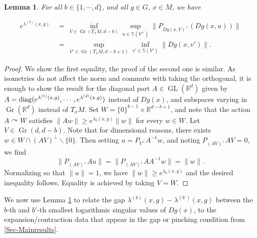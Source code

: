 \documentclass[11pt, leqno, fleqn]{amsart}
\newcommand{\margem}[1]{\marginpar{{\scriptsize {#1}}}}
\def\clo{   \color{orange}}
\def\clb{   \color{black}}
\newcommand{\SectionSymbol}{\textsection}
\def \R{{\mathbb R}}
\DeclareMathOperator{\Gr}{Gr}
\newcommand{\acts}{\curvearrowright}
\newcommand{\aryst}{\begin{eqnarray*}}
\newcommand{\earyst}{\end{eqnarray*}}
\newtheorem{lemma}[thm]{\bf Lemma}
\theoremstyle{definition}
\theoremstyle{definition}
\def\S{ {\mathbb{S}} }
\DeclareMathOperator{\GL}{GL}
\newcommand{\diag}{\mathop{\rm diag}}
\begin{document}
	
	\begin{lemma} \label{lem lambdab}
		For all  $b  \in \{1, \cdots, d \}$, and all $g\in G$,  $x \in M$, we have 
		
		
		\begin{align*}
		e^{\lambda^{(b)}(x, g )}  
		&\,= \, \inf_{V \in \Gr(T_x M, d -b ) } \sup_{u \in \S(V^{\perp}) } \|  P_{Dg(x, V)^{\perp}}( Dg(x, u) ) \| \\
		&\,= \, \sup_{V' \in \Gr(T_x M, d - b + 1)}  \inf_{v' \in \S(V')} \| Dg(x, v') \|.
		\end{align*}

	\end{lemma}
	
	
	\begin{proof} We show the first equality, the proof of the second one is similar. As  isometries do not affect the norm and commute with taking the orthogonal, it is enough to show the result for the diagonal part $A\in \GL(\R^d)$ given by $A=\diag(e^{\lambda^{(1)}(x, g)}, \cdots, e^{\lambda^{(d)}(x, g)})$ instead of $Dg(x)$, and subspaces varying in $\Gr(\R^d)$ instead of $T_{x}M$. 
Set $W= \{0\}^{b-1}\times \R^{d-b+1}$, and note that  the action $A  \acts W$ satisfies $\|A w\|\geq e^{\lambda_{b}(x,g)}\|w\|$ for every $w \in W$. Let $V\in \Gr(d, d-b)$. Note that for dimensional reasons, there exists $w\in W\cap (AV)^\perp\smallsetminus \{0\}$.  Then  setting $u=P_{V^\perp}A^{-1}w$, and noting $P_{(AV)^\perp} AV=0$, we find
$$\|P_{(AV)^\perp} Au\|= \| P_{(AV)^\perp} A A^{-1}w\|=\|w\|.$$
Normalizing so that $\|u\|=1$, we have $\|w\|\geq e^{\lambda_{b}(x,g)}$ and the desired inequality follows. Equality is achieved by taking $V=W$.
\end{proof}
	
		We now use Lemma \ref{lem lambdab} to relate the gap $\lambda^{(b)}(x, g) -  \lambda^{(b')}(x, g)$ between the $b$-th and $b'$-th smallest logarithmic singular values of $D g(x)$, to the expansion/contraction data that appear in the gap or pinching condition from \SectionSymbol \ref{Sec-Mainresults}.
	 	
\end{document}
